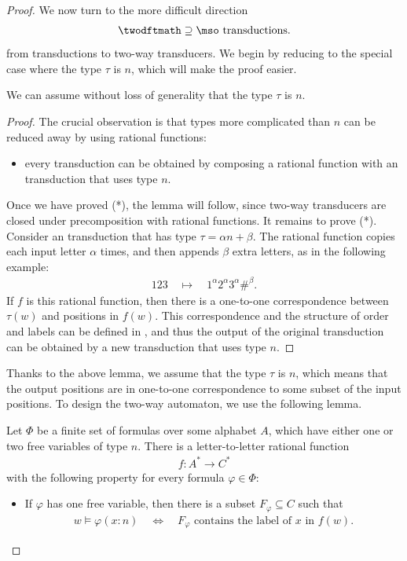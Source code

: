 \begin{proof}
    We now turn to the more difficult direction
    \begin{align*}
    \twodftmath \supseteq \mso \text{ transductions}.
    \end{align*} from \mso transductions to two-way transducers. We begin by reducing to the special case where the type $\tau$ is $n$, which will make the proof easier. 
    \begin{lemma}\label{lem:logic-reduction-to-type-n}
        We can assume without loss of generality that the type $\tau$ is $n$.
    \end{lemma}
    \begin{proof}
        The crucial observation is that types more complicated than $n$ can be reduced away by using rational functions:
        \begin{itemize}
            \item[(*)] every \mso transduction can be obtained by composing a rational function with an \mso transduction that uses type $n$.
        \end{itemize}
        Once we have proved (*), the lemma will follow, since two-way transducers are closed under precomposition with rational functions. It remains to prove (*). Consider an \mso transduction that has  type $\tau = \alpha n + \beta$. The rational function copies each input letter $\alpha$ times, and then appends $\beta$ extra letters, as in the following example:
\begin{align*}
123 \quad \mapsto \quad 1^\alpha 2^\alpha 3^\alpha \#^\beta.
\end{align*}
If $f$ is this rational function, then there is a one-to-one correspondence between $\tau(w)$ and positions in $f(w)$. This correspondence and the structure of order and labels can be defined in \mso, and thus the output of the original \mso transduction can be obtained by a new \mso transduction that uses type $n$.
    \end{proof}

    Thanks to the above lemma, we assume that the type $\tau$ is $n$, which means that the output positions are in one-to-one correspondence to some subset of  the input positions. To design the two-way automaton, we use the following lemma. 
    \begin{lemma}\label{lem:logic-precomputation}
        Let $\Phi$ be a finite set of \mso formulas over some alphabet $A$, which have either one or two free variables of type $n$.  There is a letter-to-letter rational function 
        \begin{align*}
        f : A^* \to C^*
        \end{align*}
        with the following property for every formula $\varphi \in \Phi$: 
        \begin{itemize}
            \item If   $\varphi$  has one free variable, then there is a subset $F_\varphi \subseteq C$ such that  
            \begin{align*}
            w \models \varphi(x: n) \quad \iff \quad \text{$F_\varphi$ contains the label of $x$ in $f(w)$}.
            \end{align*}


\end{itemize}
\end{lemma}
\end{proof}

